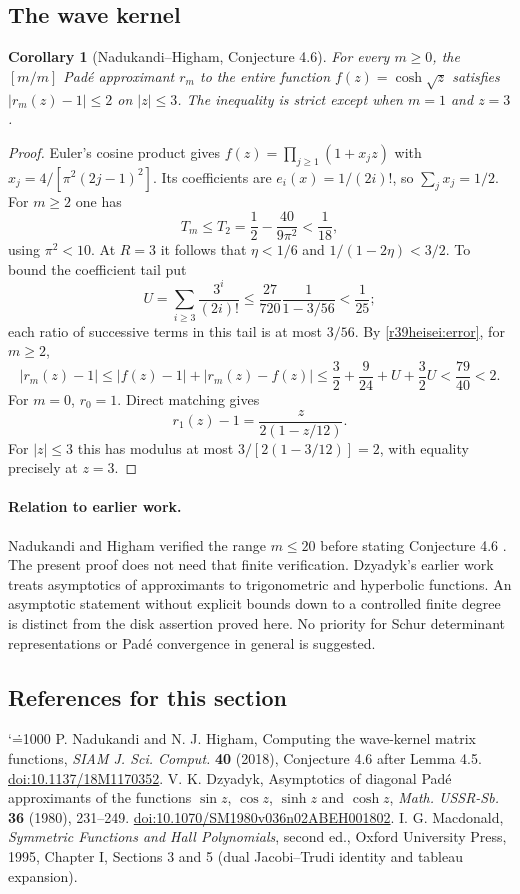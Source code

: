 \documentclass[11pt,a4paper]{article}
\makeatletter
\numberwithin{equation}{section}
\newtheorem{corollary}[theorem]{Corollary}
\theoremstyle{definition}
\theoremstyle{remark}
\renewenvironment{thebibliography}[1]
 {\subsection*{References for this section}\small
  \list{\@biblabel{\@arabic\c@enumiv}}
       {\settowidth\labelwidth{\@biblabel{#1}}\leftmargin\labelwidth
        \advance\leftmargin\labelsep\@openbib@code
        \usecounter{enumiv}\let\p@enumiv\@empty
        \renewcommand\theenumiv{\@arabic\c@enumiv}}
  \sloppy\clubpenalty4000\widowpenalty4000\sfcode`\.=1000\relax}
 {\def\@noitemerr{\@latex@warning{Empty bibliography}}\endlist}
\makeatother
\begin{document}
\subsection{The wave kernel}
\begin{corollary}[Nadukandi--Higham, Conjecture 4.6]
For every $m\ge0$, the $[m/m]$ Pad\'e approximant $r_m$ to the entire function $f(z)=\cosh\sqrt z$ satisfies $|r_m(z)-1|\le2$ on $|z|\le3$. The inequality is strict except when $m=1$ and $z=3$.
\end{corollary}
\begin{proof}
Euler's cosine product gives $f(z)=\prod_{j\ge1}(1+x_jz)$ with $x_j=4/[\pi^2(2j-1)^2]$. Its coefficients are $e_i(x)=1/(2i)!$, so $\sum_jx_j=1/2$. For $m\ge2$ one has
\[
  T_m\le T_2=\frac12-\frac{40}{9\pi^2}<\frac1{18},
\]
using $\pi^2<10$. At $R=3$ it follows that $\eta<1/6$ and $1/(1-2\eta)<3/2$. To bound the coefficient tail put
\[
 U=\sum_{i\ge3}\frac{3^i}{(2i)!}
 \le \frac{27}{720}\frac1{1-3/56}<\frac1{25};
\]
each ratio of successive terms in this tail is at most $3/56$. By \eqref{r39heisei:error}, for $m\ge2$,
\[
 |r_m(z)-1|
 \le |f(z)-1|+|r_m(z)-f(z)|
 \le\frac32+\frac9{24}+U+\frac32 U
 <\frac{79}{40}<2 .
\]
For $m=0$, $r_0=1$. Direct matching gives
\[
 r_1(z)-1=\frac{z}{2(1-z/12)}.
\]
For $|z|\le3$ this has modulus at most $3/[2(1-3/12)]=2$, with equality precisely at $z=3$.
\end{proof}

\paragraph{Relation to earlier work.} Nadukandi and Higham verified the range $m\le20$ before stating Conjecture 4.6 \cite{r39heisei:nh}. The present proof does not need that finite verification. Dzyadyk's earlier work \cite{r39heisei:dz} treats asymptotics of approximants to trigonometric and hyperbolic functions. An asymptotic statement without explicit bounds down to a controlled finite degree is distinct from the disk assertion proved here. No priority for Schur determinant representations or Pad\'e convergence in general is suggested.

\begin{thebibliography}{9}
 P. Nadukandi and N. J. Higham, Computing the wave-kernel matrix functions, \emph{SIAM J. Sci. Comput.} \textbf{40} (2018), Conjecture 4.6 after Lemma 4.5. \href{https://doi.org/10.1137/18M1170352}{doi:10.1137/18M1170352}.
 V. K. Dzyadyk, Asymptotics of diagonal Pad\'e approximants of the functions $\sin z$, $\cos z$, $\sinh z$ and $\cosh z$, \emph{Math. USSR-Sb.} \textbf{36} (1980), 231--249. \href{https://doi.org/10.1070/SM1980v036n02ABEH001802}{doi:10.1070/SM1980v036n02ABEH001802}.
 I. G. Macdonald, \emph{Symmetric Functions and Hall Polynomials}, second ed., Oxford University Press, 1995, Chapter I, Sections 3 and 5 (dual Jacobi--Trudi identity and tableau expansion).
\end{thebibliography}
\end{document}
